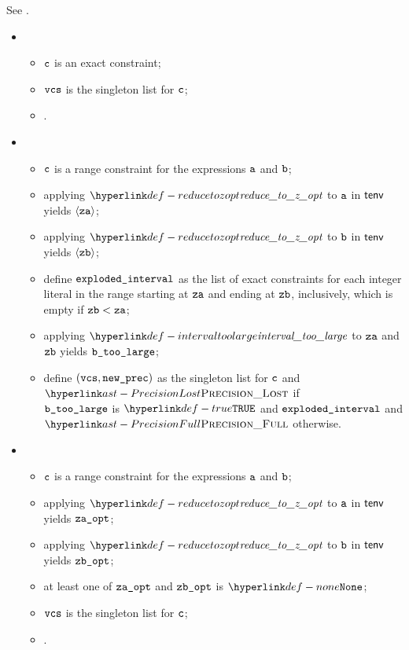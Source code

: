 See .

\ProseParagraph
\OneApplies
\begin{itemize}
  \item {}
  \begin{itemize}
    \item $\texttt{c}$ is an exact constraint;
    \item $\texttt{vcs}$ is the singleton list for $\texttt{c}$;
    \item \Proseeqdef{$\newprec$}{$\PrecisionFull$}.
  \end{itemize}

  \item {}
  \begin{itemize}
    \item $\texttt{c}$ is a range constraint for the expressions $\texttt{a}$ and $\texttt{b}$;
    \item applying $\reducetozopt$ to $\texttt{a}$ in $\textsf{tenv}$ yields $\langle\texttt{za}\rangle$;
    \item applying $\reducetozopt$ to $\texttt{b}$ in $\textsf{tenv}$ yields $\langle\texttt{zb}\rangle$;
    \item define $\texttt{exploded\_interval}$ as the list of exact constraints for each integer literal in the range starting
          at $\texttt{za}$ and ending at $\texttt{zb}$, inclusively, which is empty if $\texttt{zb} < \texttt{za}$;
    \item applying $\intervaltoolarge$ to $\texttt{za}$ and $\texttt{zb}$ yields $\texttt{b\_too\_large}$;
    \item define $(\texttt{vcs}, \texttt{new\_prec})$ as
          the singleton list for $\texttt{c}$ and $\PrecisionLost$ if \\
          $\texttt{b\_too\_large}$ is $\True$
          and $\texttt{exploded\_interval}$ and $\PrecisionFull$ otherwise.
  \end{itemize}

  \item {}
  \begin{itemize}
    \item $\texttt{c}$ is a range constraint for the expressions $\texttt{a}$ and $\texttt{b}$;
    \item applying $\reducetozopt$ to $\texttt{a}$ in $\textsf{tenv}$ yields $\texttt{za\_opt}$;
    \item applying $\reducetozopt$ to $\texttt{b}$ in $\textsf{tenv}$ yields $\texttt{zb\_opt}$;
    \item at least one of $\texttt{za\_opt}$ and $\texttt{zb\_opt}$ is $\None$;
    \item $\texttt{vcs}$ is the singleton list for $\texttt{c}$;
    \item \Proseeqdef{$\newprec$}{$\PrecisionFull$}.
  \end{itemize}
\end{itemize}

